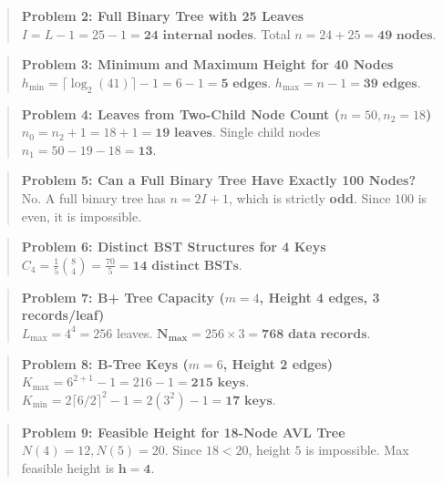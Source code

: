 \begin{quote}
\textbf{Problem 2: Full Binary Tree with 25 Leaves}\\
$I = L - 1 = 25 - 1 = \mathbf{24 \text{ internal nodes}}$. Total $n = 24 + 25 = \mathbf{49 \text{ nodes}}$.
\end{quote}

\begin{quote}
\textbf{Problem 3: Minimum and Maximum Height for 40 Nodes}\\
$h_{\min} = \lceil \log_2(41) \rceil - 1 = 6 - 1 = \mathbf{5 \text{ edges}}$. $h_{\max} = n - 1 = \mathbf{39 \text{ edges}}$.
\end{quote}

\begin{quote}
\textbf{Problem 4: Leaves from Two-Child Node Count ($n=50, n_2=18$)}\\
$n_0 = n_2 + 1 = 18 + 1 = \mathbf{19 \text{ leaves}}$. Single child nodes $n_1 = 50 - 19 - 18 = \mathbf{13}$.
\end{quote}

\begin{quote}
\textbf{Problem 5: Can a Full Binary Tree Have Exactly 100 Nodes?}\\
No. A full binary tree has $n = 2I + 1$, which is strictly \textbf{odd}. Since $100$ is even, it is impossible.
\end{quote}

\begin{quote}
\textbf{Problem 6: Distinct BST Structures for 4 Keys}\\
$C_4 = \frac{1}{5} \binom{8}{4} = \frac{70}{5} = \mathbf{14 \text{ distinct BSTs}}$.
\end{quote}

\begin{quote}
\textbf{Problem 7: B+ Tree Capacity ($m=4$, Height 4 edges, 3 records/leaf)}\\
$L_{\max} = 4^4 = 256$ leaves. $\mathbf{N_{\max}} = 256 \times 3 = \mathbf{768 \text{ data records}}$.
\end{quote}

\begin{quote}
\textbf{Problem 8: B-Tree Keys ($m=6$, Height 2 edges)}\\
$K_{\max} = 6^{2+1} - 1 = 216 - 1 = \mathbf{215 \text{ keys}}$.\\
$K_{\min} = 2 \lceil 6/2 \rceil^2 - 1 = 2(3^2) - 1 = \mathbf{17 \text{ keys}}$.
\end{quote}

\begin{quote}
\textbf{Problem 9: Feasible Height for 18-Node AVL Tree}\\
$N(4) = 12, N(5) = 20$. Since $18 < 20$, height $5$ is impossible. Max feasible height is $\mathbf{h = 4}$.
\end{quote}

